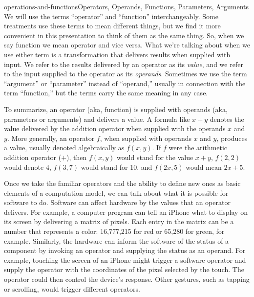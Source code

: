 \begin{aside}{operations-and-functions}{Operators, Operands, Functions, Parameters, Arguments}
We will use the terms ``operator'' and ``function'' interchangeably.
Some treatments use these terms to mean different things,
but we find it more convenient in this presentation
to think of them as the same thing.
So, when we say function we mean operator and vice versa.
What we're talking about when we use either term
is a transformation that delivers results when supplied with input.
We refer to the results delivered by an operator as its \emph{value},
and we refer to the input supplied
to the operator as its \emph{operands}.
Sometimes we use the term ``argument''
or ``parameter'' instead of ``operand,''
usually in connection with the term ``function,''
but the terms carry the same meaning in any case.

To summarize, an operator (aka, function) is supplied with operands
(aka, parameters or arguments) and delivers a value.
A formula like $x + y$ denotes the value delivered
by the addition operator when supplied with the operands $x$ and $y$.
More generally, an operator $f$, when supplied with operands $x$ and $y$,
produces a value, usually denoted algebraically as $f(x,y)$.
If $f$ were the arithmetic addition operator ($+$),
then $f(x,y)$ would stand for the value $x+y$, $f(2,2)$ would denote 4,
$f(3,7)$ would stand for 10, and $f(2x,5)$ would mean $2x+5$.
\end{aside}

Once we take the familiar operators
and the ability to define new ones
as basic elements of a computation model,
we can talk about what it is possible for software to do.
Software can affect
hardware by the values that an operator delivers.
For example, a computer program can tell an iPhone what to display
on its screen by delivering a matrix of pixels.
Each entry in the matrix
can be a number that represents a color: 16,777,215 for
red or 65,280 for green, for example.
Similarly, the hardware can inform the
software of the status of a component by
invoking an operator and supplying the status as an operand.
For example, touching the screen of an iPhone might
trigger a software operator and supply the operator with
the coordinates of the pixel selected by the touch.
The operator could then control the device's response.
Other gestures, such as tapping or
scrolling, would trigger different operators.

